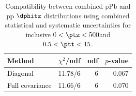 \begin{table}[htp!]
\centering
\begin{tabular}{|l|r|r|r|}
\hline
Method & $\chi^2$/ndf & ndf & $p$-value \\
\hline
Diagonal & 11.78/6 & 6 & 0.067 \\
Full covariance & 11.66/6 & 6 & 0.070 \\
\hline
\end{tabular}
\caption{Compatibility between combined pPb and pp $\dphitz$ distributions using combined statistical and systematic uncertainties for inclusive $0 < \ptz < 500$\GeV and $0.5 < \ptt < 15$\GeV.}
\label{table:chisq_dphi}
\end{table}
